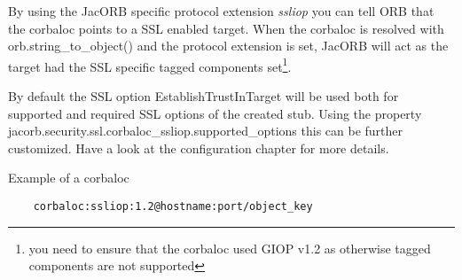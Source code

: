By using the JacORB specific protocol extension \emph{ssliop} you can tell ORB that the corbaloc points
to a SSL enabled target. When the corbaloc is resolved with orb.string\_to\_object() and the protocol extension is set,
JacORB will act as the target had the SSL specific tagged components 
set\footnote{you need to ensure that the corbaloc used GIOP v1.2 as otherwise tagged components are not supported}.

By default the SSL option EstablishTrustInTarget
will be used both for supported and required SSL options of the created stub.
Using the property jacorb.security.ssl.corbaloc\_ssliop.supported\_options this can be further customized. Have a look at 
the configuration chapter for more details.

Example of a corbaloc
\small{
\begin{verbatim}
    corbaloc:ssliop:1.2@hostname:port/object_key
\end{verbatim}
}

